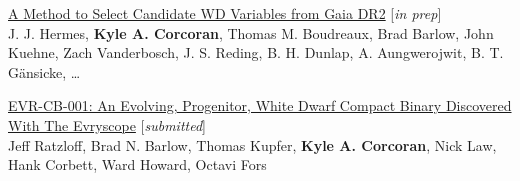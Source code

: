 \documentclass[letterpaper,12pt]{article}
\begin{document}
\vspace{3mm}
\noindent{}
\begin{etaremune}
\item \href{https://www.kyleacorcoran.com/curriculumvitae}{\textcolor{rotundaorange}{A Method to Select Candidate WD Variables from Gaia DR2}} [\textit{in prep}]\\
J. J. Hermes, \textbf{Kyle A. Corcoran}, Thomas M. Boudreaux, Brad Barlow, John Kuehne, Zach Vanderbosch, J. S. Reding, B. H. Dunlap, A. Aungwerojwit, B. T. Gänsicke, \ldots
\item \href{https://www.kyleacorcoran.com/curriculumvitae}{\textcolor{rotundaorange}{EVR-CB-001: An Evolving, Progenitor, White Dwarf Compact Binary Discovered With The Evryscope}} [\textit{submitted}]\\
Jeff Ratzloff, Brad N. Barlow, Thomas Kupfer, \textbf{Kyle A. Corcoran}, Nick Law, Hank Corbett, Ward Howard, Octavi Fors

\end{etaremune}
\end{document}

